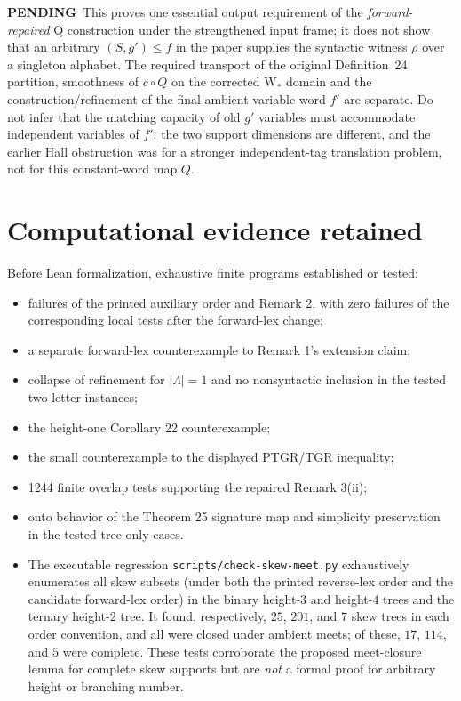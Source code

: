 \documentclass[11pt]{article}
\newcommand{\todo}{\textcolor{gray!70!black}{\textbf{PENDING}}}
\begin{document}
\todo\ This proves one essential output requirement of the
\emph{forward-repaired} Q construction under the strengthened
input frame; it does not show that an arbitrary $(S,g')\leq f$
in the paper supplies the syntactic witness $\rho$ over a
singleton alphabet. The required transport of the original
Definition~24 partition, smoothness of $c\circ Q$ on the
corrected W$_*$ domain and the construction/refinement of
the final ambient variable word $f'$ are separate.
Do not infer that the matching capacity of old $g'$
variables must accommodate independent variables of $f'$:
the two support dimensions are different, and the earlier
Hall obstruction was for a stronger independent-tag
translation problem, not for this constant-word map $Q$.

\section{Computational evidence retained}
Before Lean formalization, exhaustive finite programs established or tested:
\begin{itemize}
\item failures of the printed auxiliary order and Remark 2, with zero failures
of the corresponding local tests after the forward-lex change;
\item a separate forward-lex counterexample to Remark 1's extension claim;
\item collapse of refinement for $|\Lambda|=1$ and no nonsyntactic inclusion
in the tested two-letter instances;
\item the height-one Corollary 22 counterexample;
\item the small counterexample to the displayed PTGR/TGR inequality;
\item 1244 finite overlap tests supporting the repaired Remark 3(ii);
\item onto behavior of the Theorem 25 signature map and simplicity preservation
in the tested tree-only cases.
\item The executable regression \texttt{scripts/check-skew-meet.py}
exhaustively enumerates all skew subsets (under both the printed
reverse-lex order and the candidate forward-lex order) in the binary
height-$3$ and height-$4$ trees and the ternary height-$2$ tree.
It found, respectively, $25$, $201$, and $7$ skew trees in each order
convention, and all were closed under ambient meets; of these,
$17$, $114$, and $5$ were complete.  These tests corroborate the
proposed meet-closure lemma for complete skew supports but are
\emph{not} a formal proof for arbitrary height or branching number.
\end{itemize}
\end{document}
